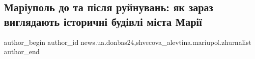  
 
 
 
 
 
\subsection{Маріуполь до та після руйнувань: як зараз виглядають історичні будівлі міста Марії}
\label{sec:09_09_2022.stz.news.ua.donbas24.1.mrpl_do_i_pislja_rujnuvanj}
 
\ifcmt
 author_begin
   author_id news.ua.donbas24,shvecova_alevtina.mariupol.zhurnalist
 author_end
\fi

